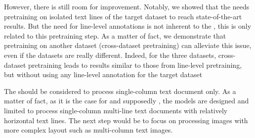 However, there is still room for improvement.  Notably, we showed that the \modelacc{} needs pretraining on isolated text lines of the target dataset to reach state-of-the-art results. But the need for line-level annotations is not inherent to the \modelacc{}, this is only related to this pretraining step. As a matter of fact, we demonstrate that pretraining on another dataset (cross-dataset pretraining) can alleviate this issue, even if the datasets are really different. Indeed, for the three datasets, cross-dataset pretraining leads to results similar to those from line-level pretraining, but without using any line-level annotation for the target dataset

The \modelacc{} should be considered to process single-column text document only. As a matter of fact, as it is the case for \cite{Bluche2016} and supposedly \cite{Yousef2020}, the models are designed and limited to process single-column multi-line text documents with relatively horizontal text lines. The next step would be to focus on processing images with more complex layout such as multi-column text images.
